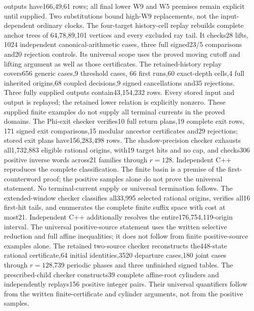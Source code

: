 \documentclass[11pt]{article}
\begin{document}
outputs have166,49,61 rows; all final lower W9 and W5 premises remain
explicit until supplied. Two substitutions bound high-W9 replacements,
not the input-dependent ordinary clocks.
The four-target history-cell replay rebuilds complete anchor trees of
64,78,89,101 vertices and every excluded ray tail. It checks28 lifts,
1024 independent canonical-arithmetic cases, three full signed23/5
comparisons and20 rejection controls. Its universal scope uses the
proved moving cutoff and lifting argument as well as those certificates.
The retained-history replay covers656 generic cases,9 threshold cases,
66 first runs,60 exact-depth cells,4 full inherited origins,68 coupled
decisions,9 signed cancellations and35 rejections. Three fully supplied
outputs contain43,154,232 rows. Every stored input and output is replayed;
the retained lower relation is explicitly nonzero. These supplied finite
examples do not supply all terminal currents in the proved domains.
The Phi-exit checker verifies10 full return plans,19 complete exit rows,
171 signed exit comparisons,15 modular ancestor certificates and29
rejections; stored exit plans have156,283,498 rows. The shadow-precision
checker exhausts all1,732,883 eligible rational origins, with19 target hits
and no cap, and checks306 positive inverse words across21 families
through $r=128$. Independent C++ reproduces the complete classification.
The finite basin is a premise of the first-counterword proof; the positive
samples alone do not prove the universal statement. No terminal-current
supply or universal termination follows.
The extended-window checker classifies all33,995 selected rational origins,
verifies all16 first-hit tails, and enumerates the complete finite suffix
space with cost at most21. Independent C++ additionally resolves the
entire176,754,119-origin interval. The universal positive-source statement
uses the written selective reduction and full affine inequalities; it
does not follow from finite positive-source examples alone.
The retained two-source checker reconstructs the448-state rational
certificate,64 initial identities,3520 departure cases,180 joint cases
through $r=128$,739 periodic phases and three unfinished signed tables.
The prescribed-child checker constructs39 complete affine-root cylinders
and independently replays156 positive integer pairs. Their universal
quantifiers follow from the written finite-certificate and cylinder
arguments, not from the positive samples.
\end{document}
